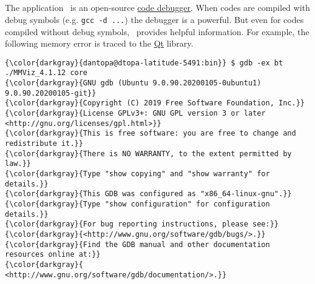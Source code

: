 % 

\subsection{\gdb}
\label{sec:gdb}
The application  \ is an open-source \href{https://www.onlinegdb.com/}{code debugger}. When codes are compiled with debug symbols (e.g. \texttt{gcc -d ...}) the debugger is a powerful. But even for codes compiled without debug symbols, \gdb \ provides helpful information. For example, the following memory error is traced to the \href{https://doc.qt.io/}{Qt} library.
{\footnotesize{
\begin{Verbatim}[commandchars=\\\{\}]
{\color{darkgray}{dantopa@dtopa-latitude-5491:bin}} $ gdb -ex bt ./MMViz_4.1.12 core
{\color{darkgray}{GNU gdb (Ubuntu 9.0.90.20200105-0ubuntu1) 9.0.90.20200105-git}}
{\color{darkgray}{Copyright (C) 2019 Free Software Foundation, Inc.}}
{\color{darkgray}{License GPLv3+: GNU GPL version 3 or later <http://gnu.org/licenses/gpl.html>}}
{\color{darkgray}{This is free software: you are free to change and redistribute it.}}
{\color{darkgray}{There is NO WARRANTY, to the extent permitted by law.}}
{\color{darkgray}{Type "show copying" and "show warranty" for details.}}
{\color{darkgray}{This GDB was configured as "x86_64-linux-gnu".}}
{\color{darkgray}{Type "show configuration" for configuration details.}}
{\color{darkgray}{For bug reporting instructions, please see:}}
{\color{darkgray}{<http://www.gnu.org/software/gdb/bugs/>.}}
{\color{darkgray}{Find the GDB manual and other documentation resources online at:}}
{\color{darkgray}{    <http://www.gnu.org/software/gdb/documentation/>.}}


\end{Verbatim}}}

